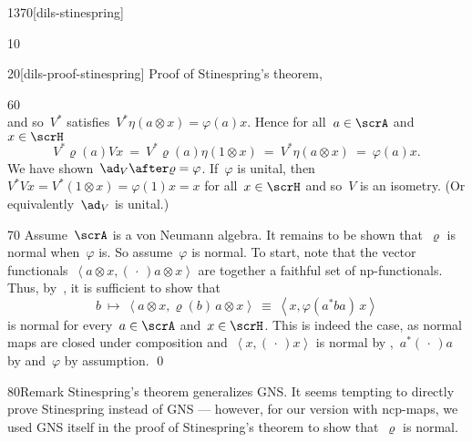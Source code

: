 \begin{parsec}{1370}[dils-stinespring]
\begin{point}{10}
\begin{point}{20}[dils-proof-stinespring]{%
    Proof of Stinespring's theorem, }
\begin{point}{60}
\begin{equation*}
\end{equation*}
    and so~$V^*$ satisfies~$V^* \eta(a \otimes x) = \varphi(a)x$.
    Hence for all~$a \in \scrA$ and~$x \in \scrH$
\begin{equation*}
    V^* \varrho(a) V x
        \ =\  V^* \varrho(a) \eta(1 \otimes x)
        \ =\  V^* \eta(a\otimes x)
        \ =\  \varphi(a)x.
\end{equation*}
We have shown~$\ad_V \after \varrho = \varphi$.
    If~$\varphi$ is unital,
    then~$V^*Vx = V^* (1\otimes x) = \varphi(1)x=x$
        for all~$x \in \scrH$ and so~$V$ is an isometry.
    (Or equivalently~$\ad_V$ is unital.)
\end{point}
\begin{point}{70}%
Assume~$\scrA$ is a von Neumann algebra.
It remains to be shown that~$\varrho$
    is normal when~$\varphi$ is.
So assume~$\varphi$ is normal.
To start, note that
    the vector functionals~$\left< a\otimes x, (\,\cdot\,) a\otimes x\right>$
    are together a faithful set of np-functionals.
Thus, by~,
    it is sufficient
    to show that
\begin{equation*}
    b \ \mapsto \ \left<a \otimes x, \varrho(b) \, a \otimes x \right>
    \ \equiv \ \left<x, \varphi(a^* b a) \,x \right>
\end{equation*}
    is normal for every~$a\in \scrA$ and~$x \in \scrH$.
    This is indeed the case, as normal
    maps are closed under composition and~$\left<x, (\,\cdot\,) x\right>$
    is normal by ,~$a^* (\,\cdot\,) a$ by 
    and~$\varphi$ by assumption.
        \qed
\end{point}
\end{point}
\begin{point}{80}{Remark}%
Stinespring's theorem generalizes GNS.
It seems tempting to directly prove Stinespring instead of GNS ---
however, for our version with ncp-maps,
we used GNS itself in the proof of Stinespring's theorem to show
that~$\varrho$ is normal.
\end{point}
\end{point}
\end{parsec}

